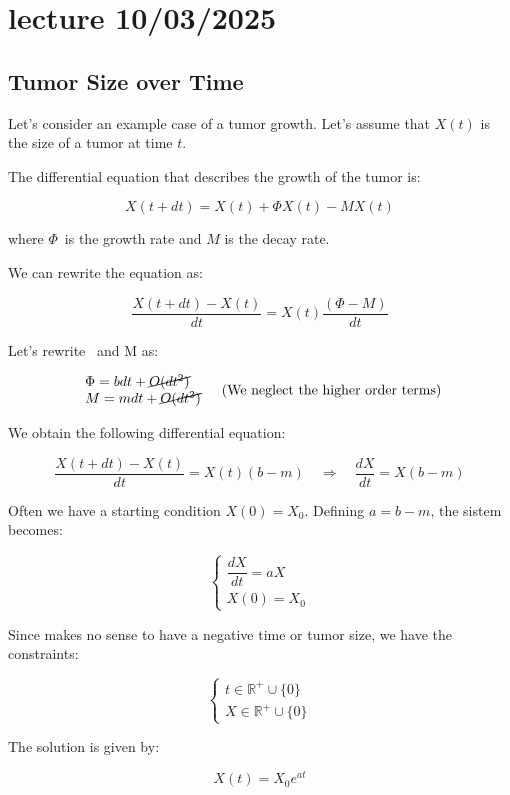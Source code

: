 \newpage

\chapter{lecture 10/03/2025}

\section{Tumor Size over Time}

Let's consider an example case of a tumor growth. Let's assume that $X(t)$ is the size of a tumor at time $t$.

The differential equation that describes the growth of the tumor is:

$$
X(t + dt) = X(t) + \Phi X(t) - M X(t)
$$

where $\Phi$\ is the growth rate and $M$ is the decay rate.

We can rewrite the equation as:

$$
\dfrac{X(t + dt) - X(t)}{dt} = X(t) \dfrac{(\Phi - M)}{dt}
$$

Let's rewrite \Phi\ and M as:

$$
\begin{array}{l}
\Phi = b dt + \cancel{O(dt^2)} \\
M = m dt + \cancel{O(dt^2)}
\end{array} \quad \text{(We neglect the higher order terms)}
$$

We obtain the following differential equation:

$$
\dfrac{X(t + dt) - X(t)}{dt} = X(t) (b - m) \quad \Rightarrow \quad \dfrac{dX}{dt} = X(b - m)
$$

Often we have a starting condition $X(0) = X_0$. Defining $a = b - m$, the sistem becomes:

$$
\begin{cases}
    \dfrac{dX}{dt} = aX \\
    X(0) = X_0
\end{cases}
$$

Since makes no sense to have a negative time or tumor size, we have the constraints:

$$
\begin{cases}
    t \in \mathbb{R}^+ \cup \{0\} \\
    X \in \mathbb{R}^+ \cup \{0\}
\end{cases}
$$

The solution is given by:

$$
X(t) = X_0 e^{at}
$$

